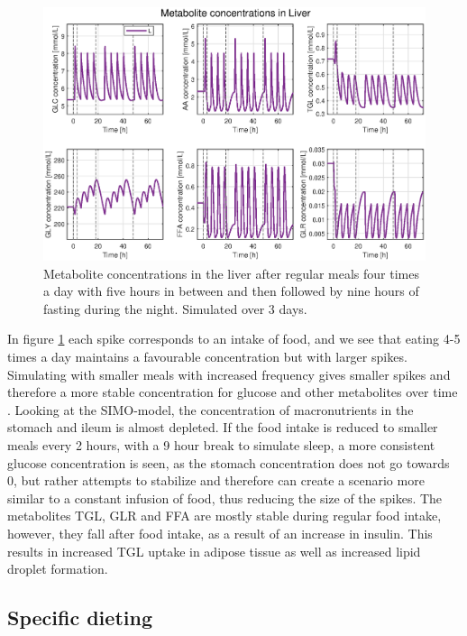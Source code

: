 \documentclass{IEEEtran}
\begin{document}
\begin{figure}[H]
    \includegraphics[trim=35 10 35 0, width=\columnwidth]{Diagrams/Food/liver_plot.eps}
    \caption{Metabolite concentrations in the liver after regular meals four times a day with five hours in between and then followed by nine hours of fasting during the night. Simulated over 3 days.}
    \label{fig:food_plots_bends_cars}
\end{figure}




In figure \ref{fig:food_plots_bends_cars} each spike corresponds to an intake of food, and we see that eating 4-5 times a day maintains a favourable concentration but with larger spikes. Simulating with smaller meals with increased frequency gives smaller spikes and therefore a more stable concentration for glucose and other metabolites over time \cite{derendorf_schmidt_rowland_tozer_2020}. Looking at the SIMO-model, the concentration of macronutrients in the stomach and ileum is almost depleted. If the food intake is reduced to smaller meals every 2 hours, with a 9 hour break to simulate sleep, a more consistent glucose concentration is seen, as the stomach concentration does not go towards 0, but rather attempts to stabilize and therefore can create a scenario more similar to a constant infusion of food, thus reducing the size of the spikes. The metabolites TGL, GLR and FFA are mostly stable during regular food intake, however, they fall after food intake, as a result of an increase in insulin. This results in increased TGL uptake in adipose tissue as well as increased lipid droplet formation.


\subsection{Specific dieting}
\end{document}
